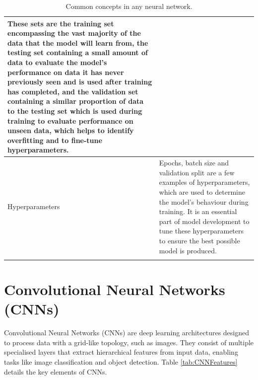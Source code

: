 \documentclass[12pt]{report}
\begin{document}
\begin{longtable}{ | p{} | p{} | }
    These sets are the training set encompassing the vast majority of the data that the model will 
    learn from, the testing set containing a small amount of data to evaluate the model's performance 
    on data it has never previously seen and is used after training has completed, 
    and the validation set containing a similar proportion of data 
    to the testing set which is used during training to evaluate performance on unseen data, which helps 
    to identify overfitting and to fine-tune hyperparameters.\\
    \hline 
    Hyperparameters & Epochs, batch size and validation split are a few examples of hyperparameters,
    which are used to determine the model's behaviour during training. It is an essential part of 
    model development to tune these hyperparameters to ensure the best possible model is produced. \\
    \hline
    \caption{Common concepts in any neural network.}\label{tab:NeuralNetworkComponents}
\end{longtable}


\section{Convolutional Neural Networks (CNNs)}
Convolutional Neural Networks (CNNs) are deep learning architectures designed to process data with a grid-like topology, such as images.
They consist of multiple specialised layers that extract hierarchical features from input data, enabling tasks like image classification and 
object detection. Table \ref{tab:CNNFeatures} details the key elements of CNNs.
\end{document}
